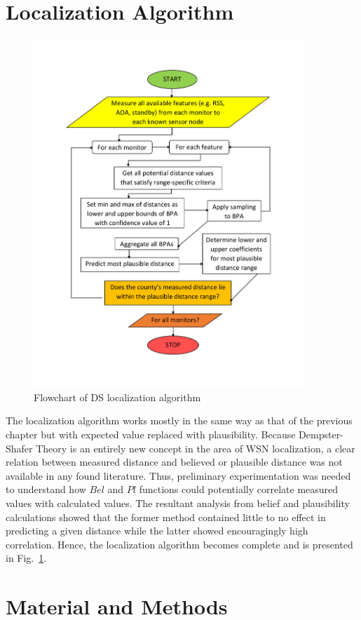 \documentclass[12pt]{uthesis-v12}  %
\begin{document}
\section{Localization Algorithm}

\begin{figure}[!t]
\centering
\includegraphics[width=4in]{flowchart2}
\caption{Flowchart of DS localization algorithm}
\label{dsalg2}
\end{figure}

The localization algorithm works mostly in the same way as that of the previous chapter but with expected value replaced with plausibility. Because Dempster-Shafer Theory is an entirely new concept in the area of WSN localization, a clear relation between measured distance and believed or plausible distance was not available in any found literature. Thus, preliminary experimentation was needed to understand how $Bel$ and $Pl$ functions could potentially correlate measured values with calculated values. The resultant analysis from belief and plausibility calculations showed that the former method contained little to no effect in predicting a given distance while the latter showed encouragingly high correlation. Hence, the localization algorithm becomes complete and is presented in Fig.~\ref{dsalg2}.

\section{Material and Methods}
\end{document}
